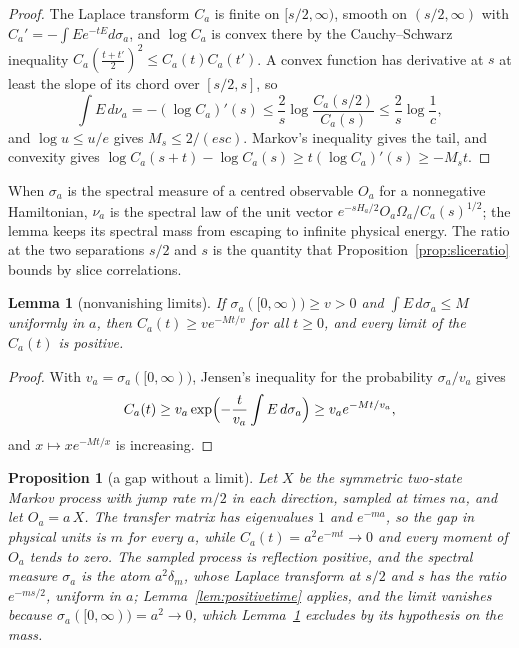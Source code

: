 \documentclass[11pt]{amsart}
\newtheorem{lemma}[theorem]{Lemma}
\newtheorem{proposition}[theorem]{Proposition}
\theoremstyle{definition}
\theoremstyle{remark}
\numberwithin{equation}{section}
\begin{document}
\begin{proof}
The Laplace transform $C_a$ is finite on $[s/2,\infty)$, smooth on
$(s/2,\infty)$ with $C_a'=-\int Ee^{-tE}d\sigma_a$, and $\log C_a$ is convex
there by the Cauchy--Schwarz inequality $C_a(\frac{t+t'}2)^2\le C_a(t)
C_a(t')$. A convex function has derivative at $s$ at least the slope of
its chord over $[s/2,s]$, so
\[
\int E\,d\nu_a=-(\log C_a)'(s)\le\frac2s\log\frac{C_a(s/2)}{C_a(s)}\le
\frac2s\log\frac1c ,
\]
and $\log u\le u/e$ gives $M_s\le2/(esc)$. Markov's inequality gives the
tail, and convexity gives $\log C_a(s+t)-\log C_a(s)\ge t(\log C_a)'(s)\ge
-M_st$.
\end{proof}

When $\sigma_a$ is the spectral measure of a centred observable $O_a$ for a
nonnegative Hamiltonian, $\nu_a$ is the spectral law of the unit vector
$e^{-sH_a/2}O_a\Omega_a/C_a(s)^{1/2}$; the lemma keeps its spectral mass
from escaping to infinite physical energy. The ratio at the two
separations $s/2$ and $s$ is the quantity that
Proposition~\ref{prop:sliceratio} bounds by slice correlations.

\begin{lemma}[nonvanishing limits]\label{lem:nonvanishing}
If $\sigma_a([0,\infty))\ge v>0$ and $\int E\,d\sigma_a\le M$ uniformly in
$a$, then $C_a(t)\ge ve^{-Mt/v}$ for all $t\ge0$, and every limit of the
$C_a(t)$ is positive.
\end{lemma}

\begin{proof}
With $v_a=\sigma_a([0,\infty))$, Jensen's inequality for the probability
$\sigma_a/v_a$ gives
\[
C_a(t)\ge v_a\exp\Bigl(-\frac t{v_a}\int E\,d\sigma_a\Bigr)\ge v_ae^{-Mt/v_a},
\]
and $x\mapsto xe^{-Mt/x}$ is increasing.
\end{proof}

\begin{proposition}[a gap without a limit]\label{prop:gapnolimit}
Let $X$ be the symmetric two-state Markov process with jump rate $m/2$ in
each direction, sampled at times $na$, and let $O_a=a\,X$. The transfer
matrix has eigenvalues $1$ and $e^{-ma}$, so the gap in physical units is
$m$ for every $a$, while $C_a(t)=a^2e^{-mt}\to0$ and every moment of $O_a$
tends to zero. The sampled process is reflection positive, and the
spectral measure $\sigma_a$ is the atom $a^2\delta_m$, whose Laplace
transform at $s/2$ and $s$ has the ratio $e^{-ms/2}$, uniform in $a$;
Lemma~\ref{lem:positivetime} applies, and the limit vanishes because
$\sigma_a([0,\infty))=a^2\to0$, which Lemma~\ref{lem:nonvanishing}
excludes by its hypothesis on the mass.
\end{proposition}
\end{document}
